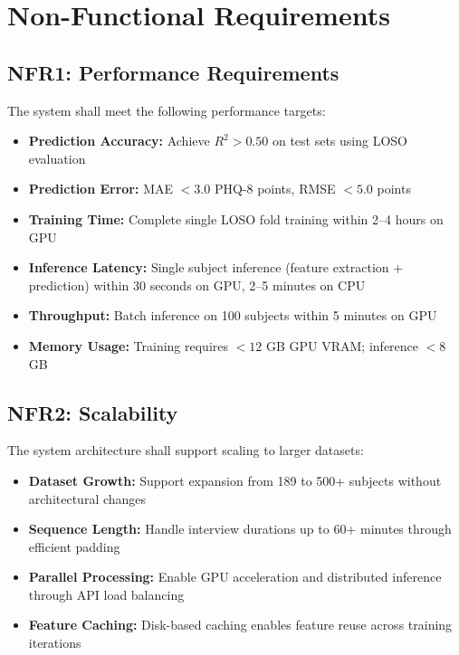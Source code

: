\documentclass[12pt]{article}
\begin{document}

	\section{Non-Functional Requirements}

	\subsection{NFR1: Performance Requirements}

	The system shall meet the following performance targets:

	\begin{itemize}
		\item \textbf{Prediction Accuracy:} Achieve $R^2 > 0.50$ on test sets using LOSO evaluation
		\item \textbf{Prediction Error:} MAE $< 3.0$ PHQ-8 points, RMSE $< 5.0$ points
		\item \textbf{Training Time:} Complete single LOSO fold training within 2--4 hours on GPU
		\item \textbf{Inference Latency:} Single subject inference (feature extraction + prediction) within 30 seconds on GPU, 2--5 minutes on CPU
		\item \textbf{Throughput:} Batch inference on 100 subjects within 5 minutes on GPU
		\item \textbf{Memory Usage:} Training requires $< 12$ GB GPU VRAM; inference $< 8$ GB
	\end{itemize}

	\subsection{NFR2: Scalability}

	The system architecture shall support scaling to larger datasets:

	\begin{itemize}
		\item \textbf{Dataset Growth:} Support expansion from 189 to 500+ subjects without architectural changes
		\item \textbf{Sequence Length:} Handle interview durations up to 60+ minutes through efficient padding
		\item \textbf{Parallel Processing:} Enable GPU acceleration and distributed inference through API load balancing
		\item \textbf{Feature Caching:} Disk-based caching enables feature reuse across training iterations
	\end{itemize}
\end{document}
